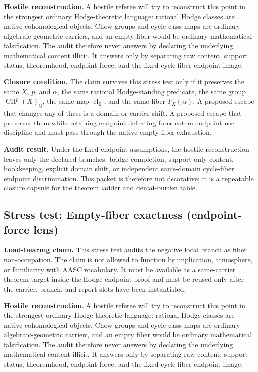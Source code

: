 \documentclass[11pt]{article}
\newcommand{\QQ}{\mathbb{Q}}
\newcommand{\CH}{\operatorname{CH}}
\newcommand{\clQ}{\operatorname{cl}_{\QQ}}
\begin{document}
\par\noindent\textbf{Hostile reconstruction.} A hostile referee will try to reconstruct this point in the strongest ordinary Hodge-theoretic language: rational Hodge classes are native cohomological objects, Chow groups and cycle-class maps are ordinary algebraic-geometric carriers, and an empty fiber would be ordinary mathematical falsification. The audit therefore never answers by declaring the underlying mathematical content illicit. It answers only by separating raw content, support status, theoremhood, endpoint force, and the fixed cycle-fiber endpoint image.

\par\noindent\textbf{Closure condition.} The claim survives this stress test only if it preserves the same $X$, $p$, and $\alpha$, the same rational Hodge-standing predicate, the same group $\CH^p(X)_\QQ$, the same map $\clQ$, and the same fiber $F_X(\alpha)$. A proposed escape that changes any of these is a domain or carrier shift. A proposed escape that preserves them while retaining endpoint-defeating force enters endpoint-use discipline and must pass through the native empty-fiber exhaustion.

\par\noindent\textbf{Audit result.} Under the fixed endpoint assumptions, the hostile reconstruction leaves only the declared branches: bridge completion, support-only content, bookkeeping, explicit domain shift, or independent same-domain cycle-fiber endpoint discrimination. This packet is therefore not decorative; it is a repeatable closure capsule for the theorem ladder and denial-burden table.


\subsection{Stress test: Empty-fiber exactness (endpoint-force lens)}

\par\noindent\textbf{Load-bearing claim.} This stress test audits the negative local branch as fiber non-occupation. The claim is not allowed to function by implication, atmosphere, or familiarity with AASC vocabulary. It must be available as a same-carrier theorem target inside the Hodge endpoint proof and must be reused only after the carrier, branch, and report slots have been instantiated.

\par\noindent\textbf{Hostile reconstruction.} A hostile referee will try to reconstruct this point in the strongest ordinary Hodge-theoretic language: rational Hodge classes are native cohomological objects, Chow groups and cycle-class maps are ordinary algebraic-geometric carriers, and an empty fiber would be ordinary mathematical falsification. The audit therefore never answers by declaring the underlying mathematical content illicit. It answers only by separating raw content, support status, theoremhood, endpoint force, and the fixed cycle-fiber endpoint image.
\end{document}
